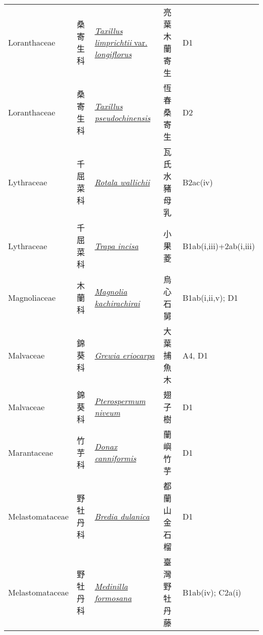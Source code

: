 {\begin{longtable}{p{2.5cm}p{2cm}p{5cm}p{2.5cm}p{3cm}}
    Loranthaceae & 桑寄生科 & \href{http://www.theplantlist.org/tpl1.1/search?q=Taxillus+limprichtii+var.+longiflorus}{\textit{Taxillus limprichtii} var. \textit{longiflorus} } & 亮葉木蘭寄生 & D1 \index{Taxillus@\textit{Taxillus}!limprichtii@\textit{limprichtii}!var. longiflorus@var. \textit{longiflorus}}  \index{亮葉木蘭寄生} \\
    Loranthaceae & 桑寄生科 & \href{http://www.theplantlist.org/tpl1.1/search?q=Taxillus+pseudochinensis}{\textit{Taxillus pseudochinensis} } & 恆春桑寄生 & D2 \index{Taxillus@\textit{Taxillus}!pseudochinensis@\textit{pseudochinensis}}  \index{恆春桑寄生} \\
    Lythraceae & 千屈菜科 & \href{http://www.theplantlist.org/tpl1.1/search?q=Rotala+wallichii}{\textit{Rotala wallichii} } & 瓦氏水豬母乳 & B2ac(iv) \index{Rotala@\textit{Rotala}!wallichii@\textit{wallichii}}  \index{瓦氏水豬母乳} \\
    Lythraceae & 千屈菜科 & \href{http://www.theplantlist.org/tpl1.1/search?q=Trapa+incisa}{\textit{Trapa incisa} } & 小果菱 & B1ab(i,iii)+2ab(i,iii) \index{Trapa@\textit{Trapa}!incisa@\textit{incisa}}  \index{小果菱} \\
    Magnoliaceae & 木蘭科 & \href{http://www.theplantlist.org/tpl1.1/search?q=Magnolia+kachirachirai}{\textit{Magnolia kachirachirai} } & 烏心石舅 & B1ab(i,ii,v); D1 \index{Magnolia@\textit{Magnolia}!kachirachirai@\textit{kachirachirai}}  \index{烏心石舅} \\
    Malvaceae & 錦葵科 & \href{http://www.theplantlist.org/tpl1.1/search?q=Grewia+eriocarpa}{\textit{Grewia eriocarpa} } & 大葉捕魚木 & A4, D1 \index{Grewia@\textit{Grewia}!eriocarpa@\textit{eriocarpa}}  \index{大葉捕魚木} \\
    Malvaceae & 錦葵科 & \href{http://www.theplantlist.org/tpl1.1/search?q=Pterospermum+niveum}{\textit{Pterospermum niveum} } & 翅子樹 & D1 \index{Pterospermum@\textit{Pterospermum}!niveum@\textit{niveum}}  \index{翅子樹} \\
    Marantaceae & 竹芋科 & \href{http://www.theplantlist.org/tpl1.1/search?q=Donax+canniformis}{\textit{Donax canniformis} } & 蘭嶼竹芋 & D1 \index{Donax@\textit{Donax}!canniformis@\textit{canniformis}}  \index{蘭嶼竹芋} \\
    Melastomataceae & 野牡丹科 & \href{http://www.theplantlist.org/tpl1.1/search?q=Bredia+dulanica}{\textit{Bredia dulanica} } & 都蘭山金石榴 & D1 \index{Bredia@\textit{Bredia}!dulanica@\textit{dulanica}}  \index{都蘭山金石榴} \\
    Melastomataceae & 野牡丹科 & \href{http://www.theplantlist.org/tpl1.1/search?q=Medinilla+formosana}{\textit{Medinilla formosana} } & 臺灣野牡丹藤 & B1ab(iv); C2a(i) \index{Medinilla@\textit{Medinilla}!formosana@\textit{formosana}}  \index{臺灣野牡丹藤} \\

\end{longtable}}
